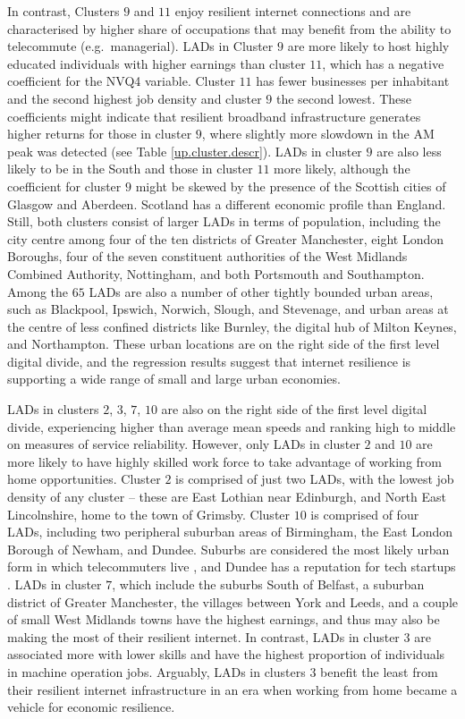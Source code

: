 \documentclass[Royal,times,sageh]{sagej}
\begin{document}
In contrast, Clusters \(9\) and \(11\) enjoy resilient internet
connections and are characterised by higher share of occupations that
may benefit from the ability to telecommute (e.g.~managerial). LADs in
Cluster \(9\) are more likely to host highly educated individuals with
higher earnings than cluster \(11\), which has a negative coefficient
for the NVQ4 variable. Cluster \(11\) has fewer businesses per
inhabitant and the second highest job density and cluster \(9\) the
second lowest. These coefficients might indicate that resilient
broadband infrastructure generates higher returns for those in cluster
\(9\), where slightly more slowdown in the AM peak was detected (see
Table \ref{up.cluster.descr}). LADs in cluster \(9\) are also less
likely to be in the South and those in cluster \(11\) more likely,
although the coefficient for cluster \(9\) might be skewed by the
presence of the Scottish cities of Glasgow and Aberdeen. Scotland has a
different economic profile than England. Still, both clusters consist of
larger LADs in terms of population, including the city centre among four
of the ten districts of Greater Manchester, eight London Boroughs, four
of the seven constituent authorities of the West Midlands Combined
Authority, Nottingham, and both Portsmouth and Southampton. Among the
\(65\) LADs are also a number of other tightly bounded urban areas, such
as Blackpool, Ipswich, Norwich, Slough, and Stevenage, and urban areas
at the centre of less confined districts like Burnley, the digital hub
of Milton Keynes, and Northampton. These urban locations are on the
right side of the first level digital divide, and the regression results
suggest that internet resilience is supporting a wide range of small and
large urban economies.

LADs in clusters \(2\), \(3\), \(7\), \(10\) are also on the right side
of the first level digital divide, experiencing higher than average mean
speeds and ranking high to middle on measures of service reliability.
However, only LADs in cluster \(2\) and \(10\) are more likely to have
highly skilled work force to take advantage of working from home
opportunities. Cluster \(2\) is comprised of just two LADs, with the
lowest job density of any cluster -- these are East Lothian near
Edinburgh, and North East Lincolnshire, home to the town of Grimsby.
Cluster \(10\) is comprised of four LADs, including two peripheral
suburban areas of Birmingham, the East London Borough of Newham, and
Dundee. Suburbs are considered the most likely urban form in which
telecommuters live \citep{e2018does}, and Dundee has a reputation for
tech startups \citep{technation2017}. LADs in cluster \(7\), which
include the suburbs South of Belfast, a suburban district of Greater
Manchester, the villages between York and Leeds, and a couple of small
West Midlands towns have the highest earnings, and thus may also be
making the most of their resilient internet. In contrast, LADs in
cluster \(3\) are associated more with lower skills and have the highest
proportion of individuals in machine operation jobs. Arguably, LADs in
clusters \(3\) benefit the least from their resilient internet
infrastructure in an era when working from home became a vehicle for
economic resilience.
\end{document}
